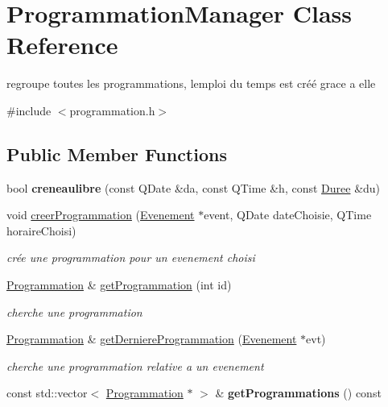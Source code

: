 \hypertarget{class_programmation_manager}{}\section{Programmation\+Manager Class Reference}
\label{class_programmation_manager}


regroupe toutes les programmations, l\textquotesingle{}emploi du temps est créé grace a elle  




{\ttfamily \#include $<$programmation.\+h$>$}

\subsection*{Public Member Functions}
\begin{DoxyCompactItemize}
\item 
\hypertarget{class_programmation_manager_a975a9226a49d850f54d5f64a407969b2}{}bool {\bfseries creneaulibre} (const Q\+Date \&da, const Q\+Time \&h, const \hyperlink{class_duree}{Duree} \&du)\label{class_programmation_manager_a975a9226a49d850f54d5f64a407969b2}

\item 
void \hyperlink{class_programmation_manager_ad2152e1d6f91acc5542caf33252640d0}{creer\+Programmation} (\hyperlink{class_evenement}{Evenement} $\ast$event, Q\+Date date\+Choisie, Q\+Time horaire\+Choisi)
\begin{DoxyCompactList}\small\item\em crée une programmation pour un evenement choisi \end{DoxyCompactList}\item 
\hyperlink{class_programmation}{Programmation} \& \hyperlink{class_programmation_manager_a7b7a03494972c8140d520f3bc24abe0a}{get\+Programmation} (int id)
\begin{DoxyCompactList}\small\item\em cherche une programmation \end{DoxyCompactList}\item 
\hyperlink{class_programmation}{Programmation} \& \hyperlink{class_programmation_manager_a012b8871019408b1a0bc4bb40696fa08}{get\+Derniere\+Programmation} (\hyperlink{class_evenement}{Evenement} $\ast$evt)
\begin{DoxyCompactList}\small\item\em cherche une programmation relative a un evenement \end{DoxyCompactList}\item 
\hypertarget{class_programmation_manager_a135184cab7050ec7568eab43f46abd02}{}const std\+::vector$<$ \hyperlink{class_programmation}{Programmation} $\ast$ $>$ \& {\bfseries get\+Programmations} () const \label{class_programmation_manager_a135184cab7050ec7568eab43f46abd02}


\end{DoxyCompactItemize}

